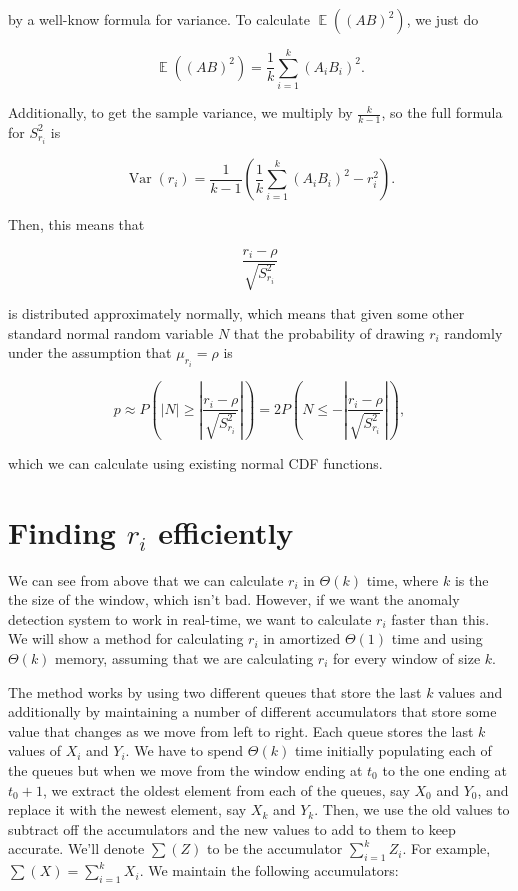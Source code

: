 \documentclass{article}
\DeclareMathOperator{\E}{\mathbb{E}}
\DeclareMathOperator{\Var}{\mathrm{Var}}
\begin{document}
by a well-know formula for variance. To calculate $\E((AB)^2)$, we just do

$$\E((AB)^2) = \frac{1}{k} \sum_{i=1}^k (A_i B_i)^2.$$

Additionally, to get the sample variance, we multiply by $\frac{k}{k-1}$, so the full formula for $S^2_{r_i}$ is

$$\Var(r_i) = \frac{1}{k-1}\left(\frac{1}{k}\sum_{i=1}^k (A_i B_i)^2 - r_i^2\right).$$

Then, this means that

$$\frac{r_i - \rho}{\sqrt{S^2_{r_i}}}$$

is distributed approximately normally, which means that given some other standard normal random variable $N$ that the probability of drawing $r_i$ randomly under the assumption that $\mu_{r_i} = \rho$ is

$$p \approx P\left(|N| \ge \left|\frac{r_i - \rho}{\sqrt{S^2_{r_i}}}\right|\right)
= 2P\left(N \le -\left|\frac{r_i - \rho}{\sqrt{S^2_{r_i}}}\right|\right),$$

which we can calculate using existing normal CDF functions.

\section{Finding $r_i$ efficiently}

We can see from above that we can calculate $r_i$ in $\Theta(k)$ time, where $k$ is the the size of the window, which isn't bad. However, if we want the anomaly detection system to work in real-time, we want to calculate $r_i$ faster than this. We will show a method for calculating $r_i$ in amortized $\Theta(1)$ time and using $\Theta(k)$ memory, assuming that we are calculating $r_i$ for every window of size $k$.

The method works by using two different queues that store the last $k$ values and additionally by maintaining a number of different accumulators that store some value that changes as we move from left to right. Each queue stores the last $k$ values of $X_i$ and $Y_i$. We have to spend $\Theta(k)$ time initially populating each of the queues but when we move from the window ending at $t_0$ to the one ending at $t_0 + 1$, we extract the oldest element from each of the queues, say $X_0$ and $Y_0$, and replace it with the newest element, say $X_k$ and $Y_k$. Then, we use the old values to subtract off the accumulators and the new values to add to them to keep accurate. We'll denote $\sum(Z)$ to be the accumulator $\sum_{i = 1}^k Z_i$. For example, $\sum(X) = \sum_{i = 1}^k X_i$. We maintain the following accumulators:
\end{document}
